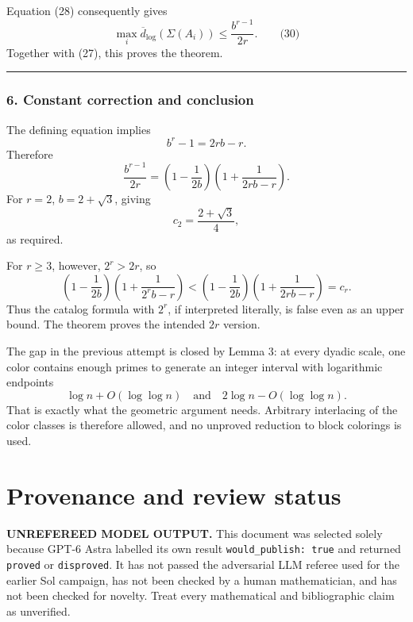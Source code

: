 \documentclass[
  11pt,
  a4paper,
]{article}
\begin{document}
Equation (28) consequently gives \[
\max_i\overline d_{\log}(\Sigma(A_i))
\le\frac{b^{r-1}}{2r}.
\qquad\text{(30)}
\] Together with (27), this proves the theorem.

\begin{center}\rule{0.5\linewidth}{0.5pt}\end{center}

\subsubsection{6. Constant correction and
conclusion}\label{constant-correction-and-conclusion}

The defining equation implies \[
b^r-1=2rb-r.
\] Therefore \[
\frac{b^{r-1}}{2r}
=
\left(1-\frac1{2b}\right)
\left(1+\frac1{2rb-r}\right).
\] For \(r=2\), \(b=2+\sqrt3\), giving \[
c_2=\frac{2+\sqrt3}{4},
\] as required.

For \(r\ge3\), however, \(2^r>2r\), so \[
\left(1-\frac1{2b}\right)
\left(1+\frac1{2^rb-r}\right)
<
\left(1-\frac1{2b}\right)
\left(1+\frac1{2rb-r}\right)
=c_r.
\] Thus the catalog formula with \(2^r\), if interpreted literally, is
false even as an upper bound. The theorem proves the intended \(2r\)
version.

The gap in the previous attempt is closed by Lemma 3: at every dyadic
scale, one color contains enough primes to generate an integer interval
with logarithmic endpoints \[
\log n+O(\log\log n)
\quad\text{and}\quad
2\log n-O(\log\log n).
\] That is exactly what the geometric argument needs. Arbitrary
interlacing of the color classes is therefore allowed, and no unproved
reduction to block colorings is used.

\appendix

\section{Provenance and review
status}\label{provenance-and-review-status}

\begin{warning}

\textbf{UNREFEREED MODEL OUTPUT.} This document was selected solely
because GPT-6 Astra labelled its own result
\texttt{would\_publish:\ true} and returned \texttt{proved} or
\texttt{disproved}. It has not passed the adversarial LLM referee used
for the earlier Sol campaign, has not been checked by a human
mathematician, and has not been checked for novelty. Treat every
mathematical and bibliographic claim as unverified.

\end{warning}
\end{document}
